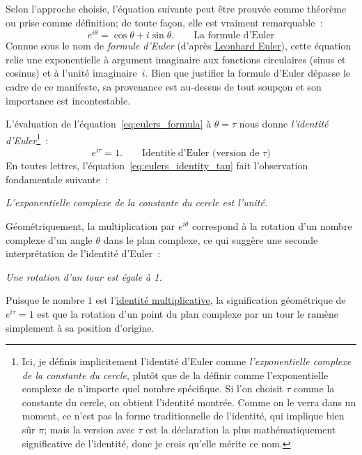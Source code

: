 Selon l'approche choisie, l'équation suivante peut être prouvée comme
théorème ou prise comme définition\ns; de toute façon, elle est vraiment remarquable~:
\begin{equation}
\label{eq:eulers_formula}
e^{i\theta} = \cos\theta + i\sin\theta. \qquad\mbox{La formule d'Euler}
\end{equation}
Connue sous le nom de \emph{formule d'Euler} (d'après
\href{https://en.wikipedia.org/wiki/Leonhard_Euler}{Leonhard Euler}), cette
équation relie une exponentielle à argument imaginaire aux fonctions circulaires
(sinus et cosinus) et à l'unité imaginaire~$i$. Bien que justifier la formule
d'Euler dépasse le cadre de ce manifeste, sa provenance est au-dessus de tout
soupçon et son importance est incontestable.

L'évaluation de l'équation~\eqref{eq:eulers_formula} à $\theta = \tau$ nous donne
\emph{l'identité d'Euler}\ns\footnote{Ici, je définis implicitement l'identité
d'Euler comme \emph{l'exponentielle complexe de la constante du cercle}, plutôt
que de la définir comme l'exponentielle complexe de n'importe quel nombre spécifique. Si l'on
choisit $\tau$ comme la constante du cercle, on obtient l'identité montrée.
Comme on le verra dans un moment, ce n'est pas la forme traditionnelle de l'identité,
qui implique bien sûr $\pi$\ns; mais la version avec $\tau$ est la déclaration
la plus mathématiquement significative de l'identité, donc je crois qu'elle
mérite ce nom.}~:
\begin{equation}
\label{eq:eulers_identity_tau}
e^{i\tau} = 1. \qquad\mathrm{Identit\acute{e}}\; \mbox{d'Euler (version de $\tau$)}
\end{equation}
En toutes lettres, l'équation~\eqref{eq:eulers_identity_tau} fait l'observation
fondamentale suivante~:

\begin{center}
\emph{L'exponentielle complexe de la constante du cercle est l'unité.}
\end{center}

Géométriquement, la multiplication par $e^{i\theta}$ correspond à la rotation
d'un nombre complexe d'un angle $\theta$ dans le plan complexe, ce qui suggère
une seconde interprétation de l'identité d'Euler~:

\begin{center}
\emph{Une rotation d'un tour est égale à 1.}
\end{center}

\noindent Puisque le nombre $1$ est
l'\href{https://fr.wikipedia.org/wiki/%C3%89l%C3%A9ment_neutre}{identité
multiplicative}, la signification géométrique de $e^{i\tau} = 1$ est que la
rotation d'un point du plan complexe par un tour le ramène simplement à sa
position d'origine.

